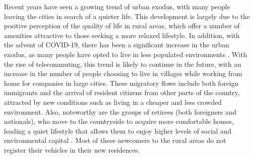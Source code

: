 Recent years have seen a growing trend of urban exodus, with many people leaving the cities in search of a quieter life. This development is largely due to the positive perception of the quality of life in rural areas, which offer a number of amenities attractive to those seeking a more relaxed lifestyle. In addition, with the advent of COVID-19, there has been a significant increase in the urban exodus, as many people have opted to live in less populated environments \cite{whitaker2021did}. With the rise of telecommuting, this trend is likely to continue in the future, with an increase in the number of people choosing to live in villages while working from home for companies in large cities. These migratory flows include both foreign immigrants and the arrival of resident citizens from other parts of the country, attracted by new conditions such as living in a cheaper and less crowded \cite{pinilla2008rural} environment. Also, noteworthy are the groups of retirees (both foreigners and nationals), who move to the countryside to acquire more comfortable homes, leading a quiet lifestyle that allows them to enjoy higher levels of social and environmental capital \cite{williams1997place,rodriguez2004international}. Most of these newcomers to the rural areas do not register their vehicles in their new residences. 

